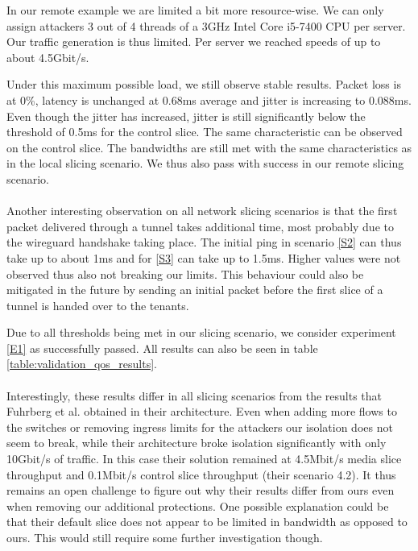 \begin{description}[style=multiline, labelwidth=0.7cm]
    In our remote example we are limited a bit more resource-wise. We can only assign attackers 3 out of 4 threads of a 3GHz Intel Core i5-7400 CPU per server. Our traffic generation is thus limited. Per server we reached speeds of up to about 4.5Gbit/s.

    Under this maximum possible load, we still observe stable results. Packet loss is at 0\%, \gls{latency} is unchanged at 0.68ms average and \gls{jitter} is increasing to 0.088ms. Even though the \gls{jitter} has increased, \gls{jitter} is still significantly below the threshold of 0.5ms for the control slice. The same characteristic can be observed on the control slice. The \gls{bandwidth}s are still met with the same characteristics as in the local slicing scenario. We thus also pass with success in our remote slicing scenario.

    \paragraph{} Another interesting observation on all network slicing scenarios is that the first packet delivered through a tunnel takes additional time, most probably due to the \gls{wireguard} handshake taking place. The initial ping in scenario \ref{S2} can thus take up to about 1ms and for \ref{S3} can take up to 1.5ms. Higher values were not observed thus also not breaking our limits. This behaviour could also be mitigated in the future by sending an initial packet before the first slice of a tunnel is handed over to the tenants.

    Due to all thresholds being met in our slicing scenario, we consider experiment \ref{E1} as successfully passed. All results can also be seen in table \ref{table:validation_qos_results}.

    \paragraph{} Interestingly, these results differ in all slicing scenarios from the results that Fuhrberg et al. \cite{SE4} obtained in their architecture. Even when adding more flows to the switches or removing ingress limits for the attackers our isolation does not seem to break, while their architecture broke isolation significantly with only 10Gbit/s of traffic. In this case their solution remained at 4.5Mbit/s media slice throughput and 0.1Mbit/s control slice throughput (their scenario 4.2). It thus remains an open challenge to figure out why their results differ from ours even when removing our additional protections. One possible explanation could be that their default slice does not appear to be limited in \gls{bandwidth} as opposed to ours. This would still require some further investigation though.


\end{description}
